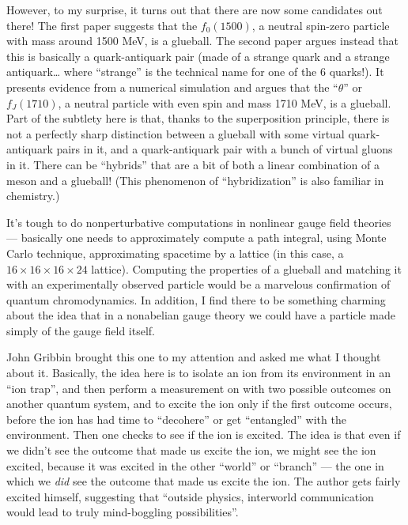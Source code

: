 \documentclass{article}
\def\tightlist{}
\renewcommand{\texttt}[1]{%
  \begingroup
  \ttfamily
  \begingroup\lccode`~=`/\lowercase{\endgroup\def~}{/\discretionary{}{}{}}%
  \begingroup\lccode`~=`[\lowercase{\endgroup\def~}{[\discretionary{}{}{}}%
  \begingroup\lccode`~=`.\lowercase{\endgroup\def~}{.\discretionary{}{}{}}%
  \catcode`/=\active\catcode`[=\active\catcode`.=\active
  \scantokens{#1\noexpand}%
  \endgroup
}
\begin{document}
However, to my surprise, it turns out that there are now some candidates
out there! The first paper suggests that the \(f_0(1500)\), a neutral
spin-zero particle with mass around 1500 MeV, is a glueball. The second
paper argues instead that this is basically a quark-antiquark pair (made
of a strange quark and a strange antiquark\ldots{} where ``strange'' is
the technical name for one of the 6 quarks!). It presents evidence from
a numerical simulation and argues that the ``\(\theta\)'' or
\(f_J(1710)\), a neutral particle with even spin and mass 1710 MeV, is a
glueball. Part of the subtlety here is that, thanks to the superposition
principle, there is not a perfectly sharp distinction between a glueball
with some virtual quark-antiquark pairs in it, and a quark-antiquark
pair with a bunch of virtual gluons in it. There can be ``hybrids'' that
are a bit of both a linear combination of a meson and a glueball! (This
phenomenon of ``hybridization'' is also familiar in chemistry.)

It's tough to do nonperturbative computations in nonlinear gauge field
theories --- basically one needs to approximately compute a path
integral, using Monte Carlo technique, approximating spacetime by a
lattice (in this case, a \(16\times16\times16\times24\) lattice).
Computing the properties of a glueball and matching it with an
experimentally observed particle would be a marvelous confirmation of
quantum chromodynamics. In addition, I find there to be something
charming about the idea that in a nonabelian gauge theory we could have
a particle made simply of the gauge field itself.


John Gribbin brought this one to my attention and asked me what I
thought about it. Basically, the idea here is to isolate an ion from its
environment in an ``ion trap'', and then perform a measurement on with
two possible outcomes on another quantum system, and to excite the ion
only if the first outcome occurs, before the ion has had time to
``decohere'' or get ``entangled'' with the environment. Then one checks
to see if the ion is excited. The idea is that even if we didn't see the
outcome that made us excite the ion, we might see the ion excited,
because it was excited in the other ``world'' or ``branch'' --- the one
in which we \emph{did} see the outcome that made us excite the ion. The
author gets fairly excited himself, suggesting that ``outside physics,
interworld communication would lead to truly mind-boggling
possibilities''.
\end{document}
